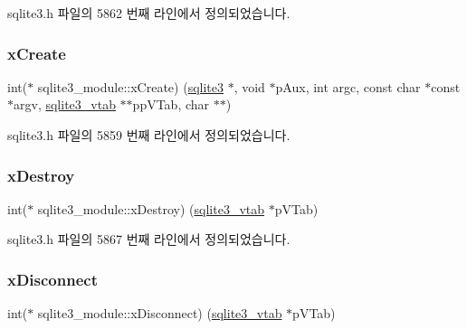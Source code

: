 sqlite3.\+h 파일의 5862 번째 라인에서 정의되었습니다.

\mbox{\label{structsqlite3__module_a5934e38da1222cac999d01d372af293e}} 
\subsubsection{\texorpdfstring{x\+Create}{xCreate}}
{\footnotesize\ttfamily int($\ast$ sqlite3\+\_\+module\+::x\+Create) (\hyperlink{sqlite3_8h_a0ef6f2646262c8a9b24368d8ac140f69}{sqlite3} $\ast$, void $\ast$p\+Aux, int argc, const char $\ast$const  $\ast$argv, \hyperlink{structsqlite3__vtab}{sqlite3\+\_\+vtab} $\ast$$\ast$pp\+V\+Tab, char $\ast$$\ast$)}



sqlite3.\+h 파일의 5859 번째 라인에서 정의되었습니다.

\mbox{\label{structsqlite3__module_a0ec3414a65bb24f400e8cfd820751412}} 
\subsubsection{\texorpdfstring{x\+Destroy}{xDestroy}}
{\footnotesize\ttfamily int($\ast$ sqlite3\+\_\+module\+::x\+Destroy) (\hyperlink{structsqlite3__vtab}{sqlite3\+\_\+vtab} $\ast$p\+V\+Tab)}



sqlite3.\+h 파일의 5867 번째 라인에서 정의되었습니다.

\mbox{\label{structsqlite3__module_a0107afd3c350db14098edbaae04342df}} 
\subsubsection{\texorpdfstring{x\+Disconnect}{xDisconnect}}
{\footnotesize\ttfamily int($\ast$ sqlite3\+\_\+module\+::x\+Disconnect) (\hyperlink{structsqlite3__vtab}{sqlite3\+\_\+vtab} $\ast$p\+V\+Tab)}



